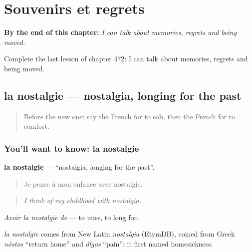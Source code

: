 
\chapter{Souvenirs et regrets}
\label{ch:fr-souvenirs-et-regrets}

\begin{chapteropening}
\textbf{By the end of this chapter:} \emph{I can talk about memories, regrets and being moved.}

Complete the last lesson of chapter 472: I can talk about memories, regrets and being moved.
\end{chapteropening}

\section[la nostalgie]{la nostalgie — nostalgia, longing for the past}

\label{lesson:FR-C472-nostalgie}



\begin{quote}
Before the new one: say the French for to sob, then the French for to comfort.
\end{quote}

\subsection*{You'll want to know: la nostalgie}
\textbf{la nostalgie} — \textquotedblleft{}nostalgia, longing for the past\textquotedblright{}.

\begin{quote}
Je pense à mon enfance avec nostalgie.
\end{quote}

\begin{quote}
\emph{I think of my childhood with nostalgia.}
\end{quote}

\emph{Avoir la nostalgie de} — to miss, to long for.

\begin{cousinweb}
\emph{la nostalgie} comes from New Latin \emph{nostalgia} (EtymDB), coined from Greek \emph{nóstos} \textquotedblleft{}return home\textquotedblright{} and \emph{álgos} \textquotedblleft{}pain\textquotedblright{}: it first named homesickness.
\end{cousinweb}

